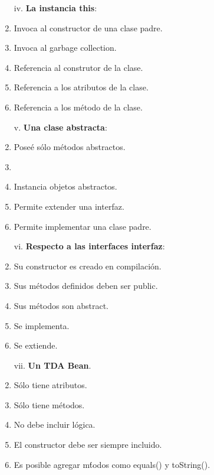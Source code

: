 \documentclass[10pt]{article}
\begin{document}
{\begin{enumerate}
\begin{multicols}{2}
			\begin{enumerate}[label=(\alph*)]
				\item[iv.] \textbf{La instancia this}:
				\item Invoca al constructor de una clase padre.
				\item Invoca al garbage collection.
				\item Referencia al construtor de la clase.
				\item Referencia a los atributos de la clase.
				\item Referencia a los m\'etodo de la clase.
			\end{enumerate}

			\begin{enumerate}[label=(\alph*)]
				\item[v.] \textbf{Una clase abstracta}:
				\item Pose\'e s\'olo m\'etodos abstractos.
				\item {}
				\item Instancia objetos abstractos.
				\item Permite extender una interfaz.
				\item Permite implementar una clase padre.
			\end{enumerate}

            \begin{enumerate}[label=(\alph*)]
				\item[vi.] \textbf{Respecto a las interfaces interfaz}:
				\item Su constructor es creado en compilaci\'on.
				\item Sus m\'etodos definidos deben ser public.
				\item Sus m\'etodos son abstract.
				\item Se implementa.
				\item Se extiende.
			\end{enumerate}

			\begin{enumerate}[label=(\alph*)]
				\item[vii.] \textbf{Un TDA Bean}.
				\item S\'olo tiene atributos.
				\item S\'olo tiene m\'etodos.
				\item No debe incluir l\'ogica.
				\item El constructor debe ser siempre incluido.
				\item Es posible agregar m\'todos como equals() y toString().
			\end{enumerate}


\end{multicols}
\end{enumerate}}
\end{document}

